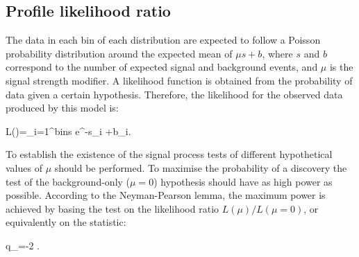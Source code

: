 \subsection{Profile likelihood ratio}

The data in each bin of each distribution are expected to follow a Poisson probability distribution around the expected mean of $\mu s+b$, where $s$ and $b$ correspond to the number of expected signal and background events, and $\mu$ is the signal strength modifier. A likelihood function is obtained from the probability of data given a certain hypothesis. Therefore, the likelihood for the observed data produced by this model is:

\be
L(\mu)=\displaystyle\prod_{i=1}^{\rm bins}  e^{-\mu s_{i} +b_{i}}.
\ee

To establish the existence of the signal process tests of different hypothetical values of $\mu$ should be performed. To maximise the probability of a discovery the test of the background-only ($\mu=0$) hypothesis should have as high power as possible. According to the Neyman-Pearson lemma, the maximum power is achieved by basing the test on the likelihood ratio $L(\mu)/L(\mu=0)$, or equivalently on the statistic:

\be
q_{\mu}=-2 \ln {}.
\ee


